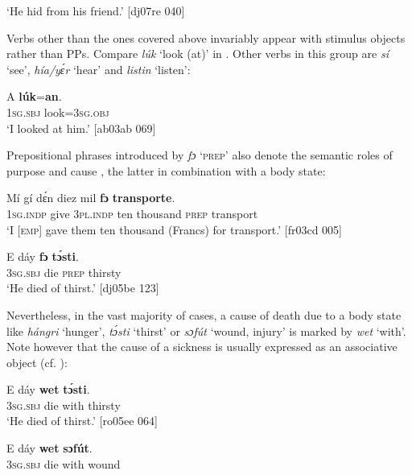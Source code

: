 \glt ‘He hid from his friend.’ [dj07re 040]
\z

Verbs other than the ones covered above invariably appear with stimulus objects rather than PPs. Compare \textit{lúk} ‘look (at)’ in . Other verbs in this group are \textit{sí} ‘see’, \textit{hía/yɛ́r} ‘hear’ and \textit{listin} ‘listen’:


\ea%
    \label{ex:key:1058}
    \gll A    \textbf{lúk}=\textbf{an}.\\
\textsc{1sg.sbj}  look=\textsc{3sg.obj}\\

\glt ‘I looked at him.’ [ab03ab 069]
\z

Prepositional phrases introduced by \textit{fɔ} ‘\textsc{prep}’ also denote the semantic roles of purpose  and cause , the latter in combination with a body state: 


\ea%
    \label{ex:key:1059}
    \gll Mí    gí  dɛ́n    diez  mil      \textbf{fɔ}  \textbf{transporte}.\\
\textsc{1sg.indp}  give  \textsc{3pl.indp}  ten  thousand  \textsc{prep}  transport\\

\glt ‘I \textsc{[emp]} gave them ten thousand (Francs) for transport.’ [fr03cd 005]
\z


\ea
	\label{ex:key:1060}
	\gll  E    dáy  \textbf{fɔ}  \textbf{tɔ́sti}.\\
\textsc{3sg.sbj}  die  \textsc{prep}  thirsty\\

\glt ‘He died of thirst.’ [dj05be 123]
\z

Nevertheless, in the vast majority of cases, a cause of death due to a body state like \textit{hángri} ‘hunger’, \textit{tɔ́sti} ‘thirst’  or \textit{sɔfút} ‘wound, injury’  is marked by \textit{wet} ‘with’. Note however that the cause of a sickness is usually expressed as an associative object (cf. ):


\ea%
    \label{ex:key:1061}
    \gll E    dáy  \textbf{wet}    \textbf{tɔ́sti}.\\
\textsc{3sg.sbj}  die  with    thirsty\\

\glt ‘He died of thirst.’ [ro05ee 064]
\z


\ea%
    \label{ex:key:1062}
    \gll E    dáy  \textbf{wet}    \textbf{sɔfút}.\\
\textsc{3sg.sbj}  die  with    wound\\

